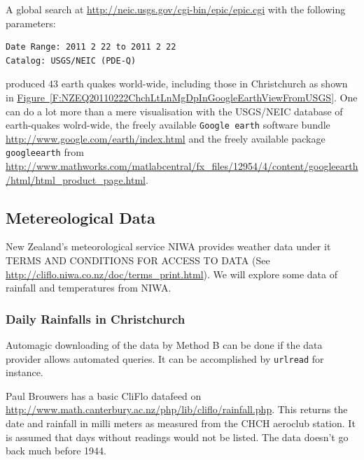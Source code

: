 A global search at \href{http://neic.usgs.gov/cgi-bin/epic/epic.cgi}{\url{http://neic.usgs.gov/cgi-bin/epic/epic.cgi}}
with the following parameters:
\begin{verbatim}
Date Range: 2011 2 22 to 2011 2 22
Catalog: USGS/NEIC (PDE-Q)
\end{verbatim}
produced 43 earth quakes world-wide, including those in Christchurch as shown in \hyperref[F:NZEQ20110222ChchLtLnMgDpInGoogleEarthViewFromUSGS]{Figure~\ref*{F:NZEQ20110222ChchLtLnMgDpInGoogleEarthViewFromUSGS}}.  One can do a lot more than a mere visualisation with the USGS/NEIC  database of earth-quakes wolrd-wide, the freely available {\tt Google earth} software bundle \href{http://www.google.com/earth/index.html}{\url{http://www.google.com/earth/index.html}} and the freely available \Matlab package {\tt googleearth} from \href{http://www.mathworks.com/matlabcentral/fx_files/12954/4/content/googleearth/html/html_product_page.html}{\url{http://www.mathworks.com/matlabcentral/fx_files/12954/4/content/googleearth/html/html_product_page.html}}.

\subsection{Metereological Data}

New Zealand's meteorological service NIWA provides weather data under it TERMS AND CONDITIONS FOR ACCESS TO DATA (See \url{http://cliflo.niwa.co.nz/doc/terms_print.html}).  We will explore some data of rainfall and temperatures from NIWA.

\subsubsection{Daily Rainfalls in Christchurch}


Automagic downloading of the data by {\sf Method B} can be done if the data provider allows automated queries.  It can be accomplished by {\tt urlread} for instance.  %




Paul Brouwers has a basic CliFlo datafeed on \url{http://www.math.canterbury.ac.nz/php/lib/cliflo/rainfall.php}.  %
This returns the date and rainfall in milli meters as measured from the CHCH aeroclub station. It is assumed that days without readings would not be listed. %
The data doesn't go back much before 1944.

